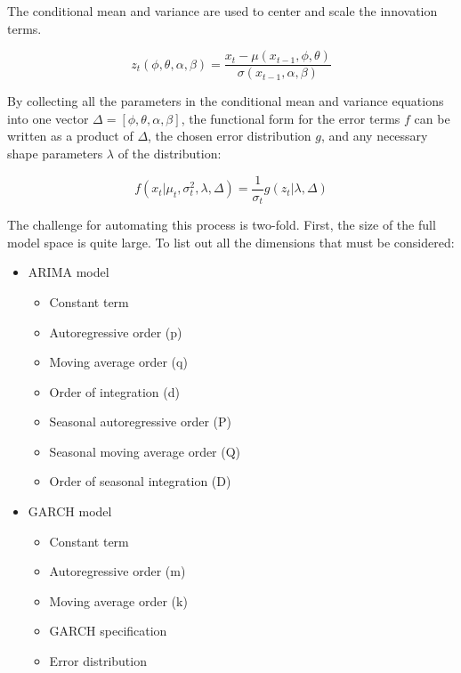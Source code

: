 \documentclass[12pt]{article}
\begin{document}
The conditional mean and variance are used to center and scale the innovation terms.

\begin{equation} \label{eq:z_score_returns}
    z_{t}(\phi, \theta, \alpha, \beta) = \frac{x_{t} - \mu(x_{t-1}, \phi, \theta)}{\sigma(x_{t-1}, \alpha, \beta)}
\end{equation}

By collecting all the parameters in the conditional mean and variance equations into one vector $\Delta = [\phi, \theta, \alpha, \beta]$, the functional form for the error terms $f$ can be written as a product of $\Delta$, the chosen error distribution $g$, and any necessary shape parameters $\lambda$ of the distribution:

\begin{equation} \label{eq:conditional_distr}
    f(x_{t} | \mu_{t}, \sigma^{2}_{t}, \lambda, \Delta) = \frac{1}{\sigma_{t}} g(z_{t} | \lambda, \Delta)
\end{equation}

The challenge for automating this process is two-fold. First, the size of the full model space is quite large. To list out all the dimensions that must be considered:

\begin{itemize}
    \item ARIMA model
        \begin{itemize}
            \item Constant term
            \item Autoregressive order (p)
            \item Moving average order (q)
            \item Order of integration (d)
            \item Seasonal autoregressive order (P)
            \item Seasonal moving average order (Q)
            \item Order of seasonal integration (D)
        \end{itemize}
        \item GARCH model
        \begin{itemize}
            \item Constant term
            \item Autoregressive order (m)
            \item Moving average order (k)
            \item GARCH specification
            \item Error distribution
        \end{itemize}

\end{itemize}
\end{document}
